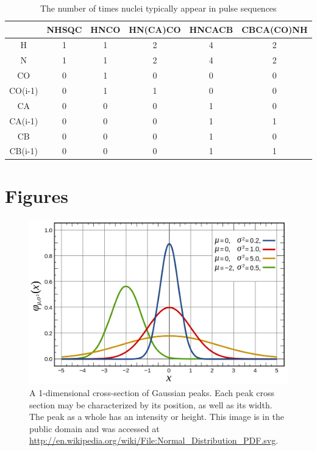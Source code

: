 \begin{table}
    \begin{tabular}{ | c || c | c | c | c | c |}
    \hline
              & NHSQC & HNCO & HN(CA)CO & HNCACB & CBCA(CO)NH \\
    \hline
      H       & 1 & 1 & 2 & 4 & 2 \\
    \hline
      N       & 1 & 1 & 2 & 4 & 2 \\
    \hline
      CO      & 0 & 1 & 0 & 0 & 0 \\
    \hline
      CO(i-1) & 0 & 1 & 1 & 0 & 0 \\
    \hline
      CA      & 0 & 0 & 0 & 1 & 0 \\
    \hline
      CA(i-1) & 0 & 0 & 0 & 1 & 1 \\
    \hline
      CB      & 0 & 0 & 0 & 1 & 0 \\
    \hline
      CB(i-1) & 0 & 0 & 0 & 1 & 1 \\
    \hline
    \end{tabular}
    \caption{The number of times nuclei typically appear in pulse sequences}
    \label{pulse_sequences}
\end{table}


\clearpage
\section{Figures}

\begin{figure}[h]
  \includegraphics[scale=0.4]{figures/peak_1d}
  \caption[A 1-dimensional cross-section of Gaussian peaks]
          {A 1-dimensional cross-section of Gaussian peaks.
           Each peak cross section may be characterized by its 
           position, as well as its width.  The peak as a whole
           has an intensity or height.  This image is in the
           public domain and was accessed at 
           \url{http://en.wikipedia.org/wiki/File:Normal_Distribution_PDF.svg}.}
  \label{peak_1d}
\end{figure}

